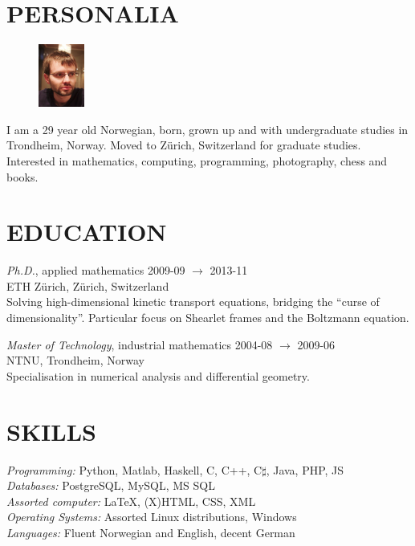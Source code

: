 \documentclass[line,margin]{res}
\newcommand{\zh}{Z\"{u}rich}
\begin{document}
\address{Forchstrasse 168, CH-8032 \zh}
\address{+41 78 634 68 37, evfonn@gmail.com}


\begin{resume}

\section{PERSONALIA}
    \begin{figure}
        \vspace{-0.6cm}
        \includegraphics[width=1.5cm]{photo.png}
    \end{figure}
    I am a 29 year old Norwegian, born, grown up and with undergraduate studies in Trondheim,
    Norway. Moved to Z\"urich, Switzerland for graduate studies. Interested in mathematics, computing,
    programming, photography, chess and books. 


\section{EDUCATION} 
    {\em Ph.D.}, applied mathematics \hfill 2009-09 $\to$ 2013-11 \\
    ETH \zh, \zh, Switzerland \\
    Solving high-dimensional kinetic transport equations, bridging the ``curse
    of dimensionality''. Particular focus on Shearlet frames and the Boltzmann
    equation.

    {\em Master of Technology}, industrial mathematics \hfill 2004-08 $\to$ 2009-06 \\
    NTNU, Trondheim, Norway \\
    Specialisation in numerical analysis and differential geometry.


\section{SKILLS}
    {\em Programming:} Python, Matlab, Haskell, C, C++, C$\sharp$, Java, PHP, JS \\
    {\em Databases:} PostgreSQL, MySQL, MS SQL \\
    {\em Assorted computer:} \LaTeX, (X)HTML, CSS, XML \\
    {\em Operating Systems:} Assorted Linux distributions, Windows \\
    {\em Languages:} Fluent Norwegian and English, decent German



\end{resume}
\end{document}
